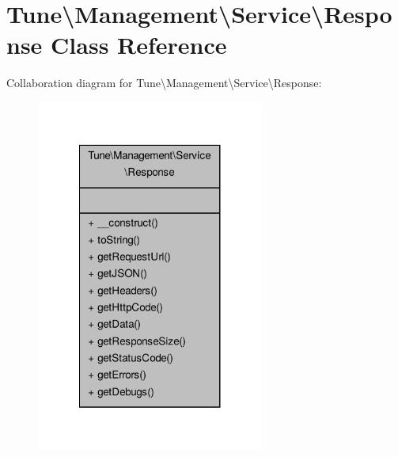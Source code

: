 \hypertarget{classTune_1_1Management_1_1Service_1_1Response}{\section{Tune\textbackslash{}Management\textbackslash{}Service\textbackslash{}Response Class Reference}
\label{classTune_1_1Management_1_1Service_1_1Response}
}


Collaboration diagram for Tune\textbackslash{}Management\textbackslash{}Service\textbackslash{}Response\-:
\nopagebreak
\begin{figure}[H]
\begin{center}
\leavevmode
\includegraphics[width=212pt]{classTune_1_1Management_1_1Service_1_1Response__coll__graph}
\end{center}
\end{figure}
